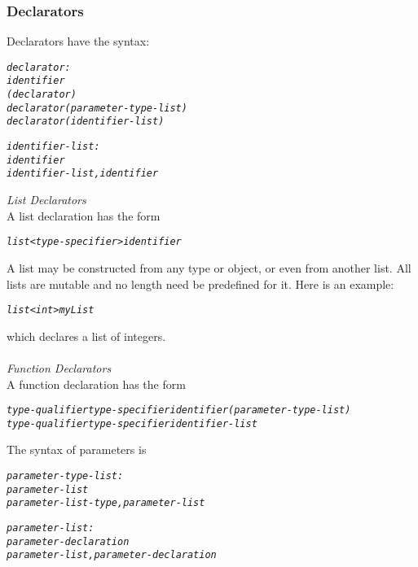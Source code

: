 \documentclass[12pt]{report}
\begin{document}
\subsubsection{Declarators}
Declarators have the syntax:
\begin{alltt}
         \textit{declarator:}
              \textit{identifier}
              \textit{( declarator )}
              \textit{declarator ( parameter-type-list )}
              \textit{declarator ( identifier-list )}
              
         \textit{identifier-list:}
              \textit{identifier}
              \textit{identifier-list, identifier}
\end{alltt}
\begin{doublespace}
\textit{List Declarators}\\
A list declaration has the form
\begin{alltt}
         \textit{list<type-specifier> identifier}
\end{alltt}
A list  may be constructed from any type or object, or even from another list. All lists are mutable and no length need be predefined for it. Here is an example:
\begin{alltt}
         \textit{list<int> myList}
\end{alltt}
which declares a list of integers.\\
\\
\textit{Function Declarators}\\
A function declaration has the form
\begin{alltt}
    \textit{type-qualifier type-specifier identifier ( parameter-type-list )}
    \textit{type-qualifier type-specifier identifier-list}
\end{alltt}
The syntax of parameters is
\begin{singlespace}
\begin{alltt}
         \textit{parameter-type-list:}
              \textit{parameter-list}
              \textit{parameter-list-type , parameter-list}
              
         \textit{parameter-list:}
              \textit{parameter-declaration}
              \textit{parameter-list , parameter-declaration}
              

\end{alltt}
\end{singlespace}
\end{doublespace}
\end{document}

